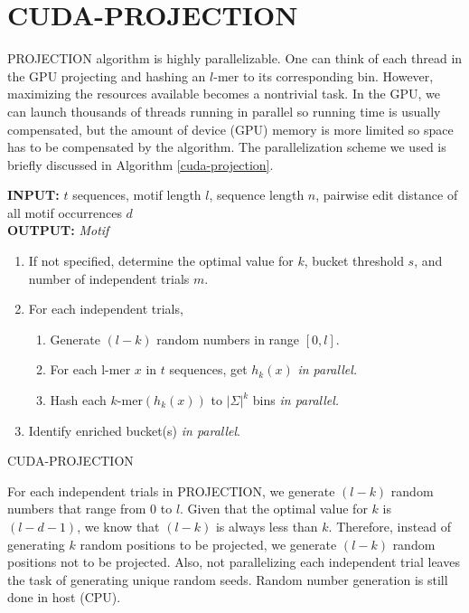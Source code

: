\documentclass{llncs}
\begin{document}
{\section{CUDA-PROJECTION}
PROJECTION algorithm is highly parallelizable. One can think of each thread in the GPU projecting and  hashing an $l$-mer  to its corresponding bin. However, maximizing  the resources available becomes a nontrivial task.  In the GPU, we can launch thousands of threads running in parallel so running time is usually compensated, but the amount of device (GPU) memory is more limited so space has to be compensated by the algorithm. The parallelization scheme we used is briefly discussed  in Algorithm \ref{cuda-projection}.

\begin{algorithm}\label{cuda-projection}
\textbf{INPUT:} $t$ sequences, motif length $l$, sequence length $n$, pairwise edit distance of all motif occurrences $d$\\
\textbf{OUTPUT:} \textit{Motif}
\begin{enumerate}
\item If not specified, determine the optimal value for $k$,  bucket threshold $s$, and  number of independent trials $m$.
\item For each independent trials, 
\begin{enumerate}
	\item Generate $(l-k)$ random numbers in range $[0,l]$.
	\item  For each l-mer $x$ in $t$ sequences, get $h_k(x)$	 \textit{in parallel.}
	\item Hash each $k$-mer$(h_k(x))$ to $|\Sigma|^k$ bins \textit{in parallel.}
\end{enumerate}

\item Identify enriched bucket(s)  \textit{in parallel}.
\end{enumerate}
\caption{CUDA-PROJECTION}
\end{algorithm}

For each independent trials in PROJECTION, we generate $(l-k)$ random numbers that range from $0$ to $l$. Given that the optimal value for $k$ is $(l-d-1)$, we know that $(l-k)$ is always less than $k$. Therefore, instead of generating $k$ random positions to be projected, we generate $(l-k)$ random positions not to be projected. Also, not parallelizing each independent trial leaves the task of generating unique random seeds. Random number generation is still done in host (CPU).

}
\end{document}

